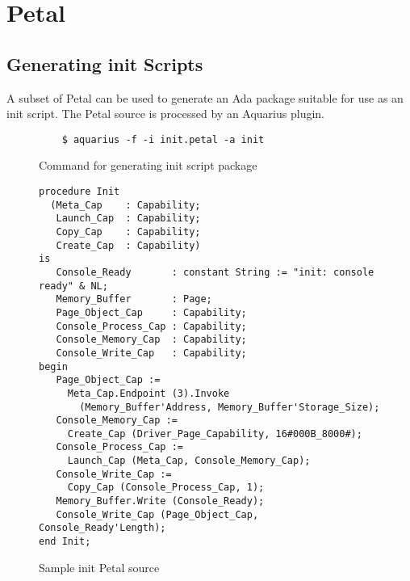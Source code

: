 \chapter{Petal}

\section{Generating init Scripts}

A subset of Petal can be used to generate an Ada package suitable for use as an init script.  The Petal source is processed by an Aquarius plugin.

\begin{figure}
\begin{verbatim}
    $ aquarius -f -i init.petal -a init
\end{verbatim}
\caption{Command for generating init script package}
\end{figure}

\begin{figure}
\begin{verbatim}
procedure Init
  (Meta_Cap    : Capability;
   Launch_Cap  : Capability;
   Copy_Cap    : Capability;
   Create_Cap  : Capability)
is
   Console_Ready       : constant String := "init: console ready" & NL;
   Memory_Buffer       : Page;
   Page_Object_Cap     : Capability;
   Console_Process_Cap : Capability;
   Console_Memory_Cap  : Capability;
   Console_Write_Cap   : Capability;
begin
   Page_Object_Cap :=
     Meta_Cap.Endpoint (3).Invoke
       (Memory_Buffer'Address, Memory_Buffer'Storage_Size);
   Console_Memory_Cap :=
     Create_Cap (Driver_Page_Capability, 16#000B_8000#);
   Console_Process_Cap :=
     Launch_Cap (Meta_Cap, Console_Memory_Cap);
   Console_Write_Cap := 
     Copy_Cap (Console_Process_Cap, 1);
   Memory_Buffer.Write (Console_Ready);
   Console_Write_Cap (Page_Object_Cap, Console_Ready'Length);
end Init;
\end{verbatim}
\caption{Sample init Petal source}
\end{figure}


